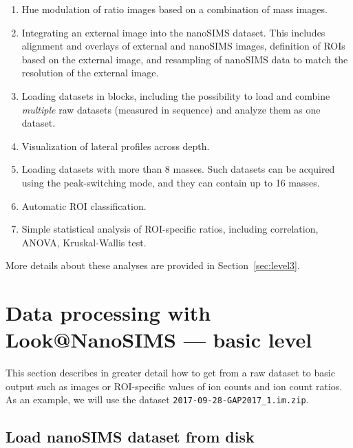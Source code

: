 \documentclass[a4paper, 11pt]{article}
\newcommand{\ttt}[1]{\texttt{#1}}
\newcommand{\lans}[1]{{\color{magenta}#1}}
\newcommand{\lanscb}[1]{{\color{darkgreen}#1}}
\newcommand{\lanstf}[1]{{\color{cyan}#1}}
\begin{document}
\begin{enumerate}

\item \lanscb{Hue modulation} of ratio images based on a combination of mass images.

\item Integrating an \lans{external image} into the nanoSIMS dataset. This includes \lans{alignment} and \lans{overlays} of external and nanoSIMS images, definition of \lanstf{ROIs based on the external image}, and \lans{resampling} of nanoSIMS data to match the resolution of the external image.

\item Loading datasets in \lans{blocks}, including the possibility to load and combine \emph{multiple} raw datasets (measured in sequence) and analyze them as one dataset.

\item Visualization of \lanscb{lateral profiles across depth}.

\item Loading datasets with more than 8 masses. Such datasets can be acquired using the peak-switching mode, and they can contain up to 16 masses.

\item Automatic ROI classification.

\item Simple statistical analysis of ROI-specific ratios, including correlation, ANOVA, Kruskal-Wallis test.

\end{enumerate}
%
More details about these analyses are provided in Section~\ref{sec:level3}.


\section{Data processing with Look@NanoSIMS --- basic level}
\label{sec:level1}

This section describes in greater detail how to get from a raw dataset to basic output such as images or ROI-specific values of ion counts and ion count ratios. As an example, we will use the dataset \ttt{2017-09-28-GAP2017\_1.im.zip}.

\addtolength{\parskip}{2mm}

\subsection{Load nanoSIMS dataset from disk}
\end{document}
